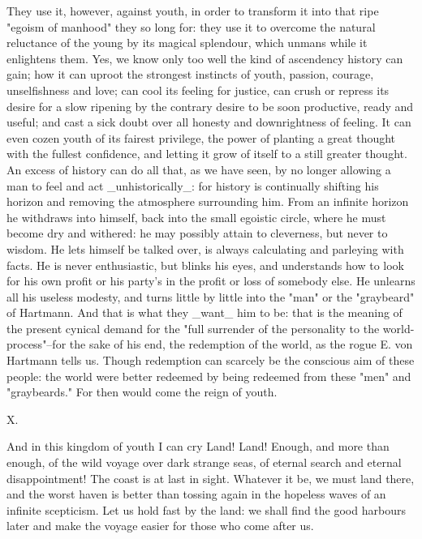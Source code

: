 They use it, however, against youth, in order to transform it into
that ripe "egoism of manhood" they so long for: they use it to
overcome the natural reluctance of the young by its magical
splendour, which unmans while it enlightens them. Yes, we know only
too well the kind of ascendency history can gain; how it can uproot
the strongest instincts of youth, passion, courage, unselfishness and
love; can cool its feeling for justice, can crush or repress its
desire for a slow ripening by the contrary desire to be soon
productive, ready and useful; and cast a sick doubt over all honesty
and downrightness of feeling. It can even cozen youth of its fairest
privilege, the power of planting a great thought with the fullest
confidence, and letting it grow of itself to a still greater thought.
An excess of history can do all that, as we have seen, by no longer
allowing a man to feel and act _unhistorically_: for history is
continually shifting his horizon and removing the atmosphere
surrounding him. From an infinite horizon he withdraws into himself,
back into the small egoistic circle, where he must become dry and
withered: he may possibly attain to cleverness, but never to wisdom.
He lets himself be talked over, is always calculating and parleying
with facts. He is never enthusiastic, but blinks his eyes, and
understands how to look for his own profit or his party's in the
profit or loss of somebody else. He unlearns all his useless modesty,
and turns little by little into the "man" or the "graybeard" of
Hartmann. And that is what they _want_ him to be: that is the meaning
of the present cynical demand for the "full surrender of the
personality to the world-process"--for the sake of his end, the
redemption of the world, as the rogue E. von Hartmann tells us.
Though redemption can scarcely be the conscious aim of these people:
the world were better redeemed by being redeemed from these "men" and
"graybeards." For then would come the reign of youth.


X.

And in this kingdom of youth I can cry Land! Land! Enough, and more
than enough, of the wild voyage over dark strange seas, of eternal
search and eternal disappointment! The coast is at last in sight.
Whatever it be, we must land there, and the worst haven is better
than tossing again in the hopeless waves of an infinite scepticism.
Let us hold fast by the land: we shall find the good harbours later
and make the voyage easier for those who come after us.

